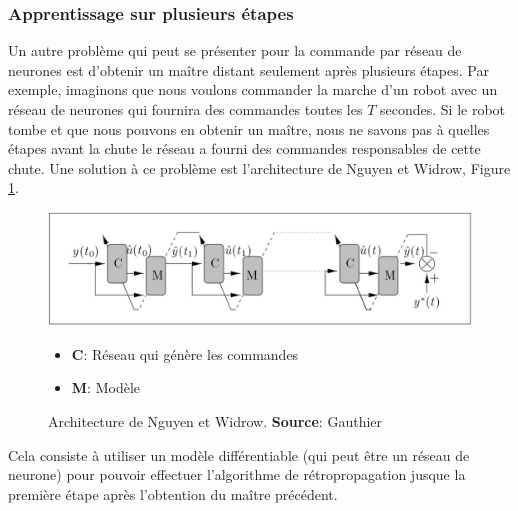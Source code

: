 \subsubsection{Apprentissage sur plusieurs étapes}
Un autre problème qui peut se présenter pour la commande par réseau de neurones est d'obtenir un maître distant seulement après plusieurs étapes.
Par exemple, imaginons que nous voulons commander la marche d'un robot avec un réseau de neurones qui fournira des commandes toutes les $T$ secondes.
Si le robot tombe et que nous pouvons en obtenir un maître, nous ne savons pas à quelles étapes avant la chute le réseau a fourni des commandes responsables de cette chute.
Une solution à ce problème est l'architecture de Nguyen et Widrow, Figure \ref{appNguyenWidrow}.
\begin{figure}
 \centering
 \includegraphics[scale=0.5]{../figures/appNguyenWidrow.jpg}
 \begin{itemize}
  \item \textbf{C}: Réseau qui génère les commandes
  \item \textbf{M}: Modèle
 \end{itemize}
 \caption{Architecture de Nguyen et Widrow. \textbf{Source}: Gauthier\cite{Gauthier}}
 \label{appNguyenWidrow}
\end{figure}
Cela consiste à utiliser un modèle différentiable (qui peut être un réseau de neurone) pour pouvoir effectuer l'algorithme de rétropropagation jusque la première étape après l'obtention du maître précédent.